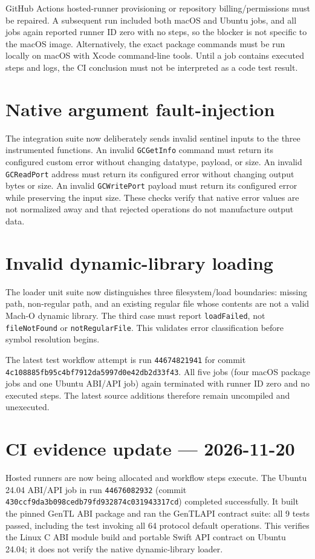 \documentclass[11pt,a4paper]{report}
\begin{document}
GitHub Actions hosted-runner provisioning or repository billing/permissions must be repaired. A subsequent run included both macOS and Ubuntu jobs, and all jobs again reported runner ID zero with no steps, so the blocker is not specific to the macOS image. Alternatively, the exact package commands must be run locally on macOS with Xcode command-line tools. Until a job contains executed steps and logs, the CI conclusion must not be interpreted as a code test result.



\section{Native argument fault-injection}
The integration suite now deliberately sends invalid sentinel inputs to the three instrumented functions. An invalid \texttt{GCGetInfo} command must return its configured custom error without changing datatype, payload, or size. An invalid \texttt{GCReadPort} address must return its configured error without changing output bytes or size. An invalid \texttt{GCWritePort} payload must return its configured error while preserving the input size. These checks verify that native error values are not normalized away and that rejected operations do not manufacture output data.



\section{Invalid dynamic-library loading}
The loader unit suite now distinguishes three filesystem/load boundaries: missing path, non-regular path, and an existing regular file whose contents are not a valid Mach-O dynamic library. The third case must report \texttt{loadFailed}, not \texttt{fileNotFound} or \texttt{notRegularFile}. This validates error classification before symbol resolution begins.



The latest test workflow attempt is run \texttt{44674821941} for commit \texttt{4c108885fb95c4bf7912da5997d0e42db2d33f43}. All five jobs (four macOS package jobs and one Ubuntu ABI/API job) again terminated with runner ID zero and no executed steps. The latest source additions therefore remain uncompiled and unexecuted.


\section{CI evidence update --- 2026-11-20}
Hosted runners are now being allocated and workflow steps execute. The Ubuntu 24.04 ABI/API job in run \texttt{44676082932} (commit \texttt{430ccf9da3b098cedb79fd932874c031943317cd}) completed successfully. It built the pinned GenTL ABI package and ran the GenTLAPI contract suite: all 9 tests passed, including the test invoking all 64 protocol default operations. This verifies the Linux C ABI module build and portable Swift API contract on Ubuntu 24.04; it does not verify the native dynamic-library loader.
\end{document}
